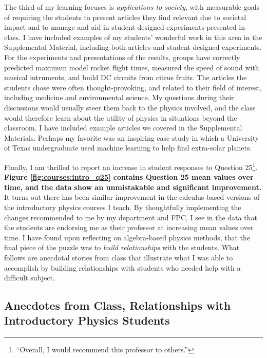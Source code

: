 \documentclass[../../main.tex]{subfiles}
\begin{document}
The third of my learning focuses is \textit{applications to society}, with measurable goals of requiring the students to present articles they find relevant due to societal impact and to manage and aid in student-designed experiments presented in class.  I have included examples of my students' wonderful work in this area in the Supplemental Material, including both articles and student-designed experiments.  For the experiments and presentations of the results, groups have correctly predicted maximum model rocket flight times, measured the speed of sound with musical intruments, and build DC circuits from citrus fruits.  The articles the students chose were often thought-provoking, and related to their field of interest, including medicine and environmental science.  My questions during their discussions would usually steer them back to the physics involved, and the class would therefore learn about the utility of physics in situations beyond the classroom.  I have included example articles we covered in the Supplemental Materials.  Perhaps my favorite was an inspiring case study in which a University of Texas undergraduate used machine learning to help find extra-solar planets.

Finally, I am thrilled to report an increase in student responses to Question 25\footnote{``Overall, I would recommend this professor to others.''}. \textbf{Figure \ref{fig:courses:intro_q25} contains Question 25 mean values over time, and the data show an unmistakable and significant improvement.}  It turns out there has been similar improvement in the calculus-based versions of the introductory physics courses I teach.  By thoughtfully implementing the changes recommended to me by my department and FPC, I see in the data that the students are endorsing me as their professor at increasing mean values over time.  I have found upon reflecting on algebra-based physics methods, that the final piece of the puzzle was to \textit{build relationships} with the students.  What follows are anecdotal stories from class that illustrate what I was able to accomplish by building relationships with students who needed help with a difficult subject.  \\ \hspace{0.1cm}

\subsection{Anecdotes from Class, Relationships with Introductory Physics Students}
\end{document}
